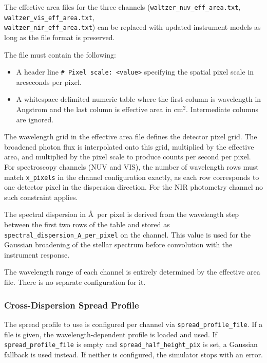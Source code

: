 The effective area files for the three channels (\texttt{waltzer\_nuv\_eff\_area.txt}, \texttt{waltzer\_vis\_eff\_area.txt}, \\ \texttt{waltzer\_nir\_eff\_area.txt}) can be replaced with updated instrument models as long as the file format is preserved.

The file must contain the following:

\begin{itemize}
    \item A header line \texttt{\# Pixel scale: <value>} specifying the spatial pixel scale in arcseconds per pixel.
    \item A whitespace-delimited numeric table where the first column is wavelength in Angstrom and the last column is effective area in cm$^2$. Intermediate columns are ignored.
\end{itemize}

The wavelength grid in the effective area file defines the detector pixel grid. The broadened photon flux is interpolated onto this grid, multiplied by the effective area, and multiplied by the pixel scale to produce counts per second per pixel. For spectroscopy channels (NUV and VIS), the number of wavelength rows must match \texttt{x\_pixels} in the channel configuration exactly, as each row corresponds to one detector pixel in the dispersion direction. For the NIR photometry channel no such constraint applies.

The spectral dispersion in \AA\ per pixel is derived from the wavelength step between the first two rows of the table and stored as \texttt{spectral\_dispersion\_A\_per\_pixel} on the channel. This value is used for the Gaussian broadening of the stellar spectrum before convolution with the instrument response.

The wavelength range of each channel is entirely determined by the effective area file. There is no separate configuration for it.

\subsubsection{Cross-Dispersion Spread Profile}

The spread profile to use is configured per channel via \texttt{spread\_profile\_file}. If a file is given, the wavelength-dependent profile is loaded and used. If \texttt{spread\_profile\_file} is empty and \texttt{spread\_half\_height\_pix} is set, a Gaussian fallback is used instead. If neither is configured, the simulator stops with an error.

